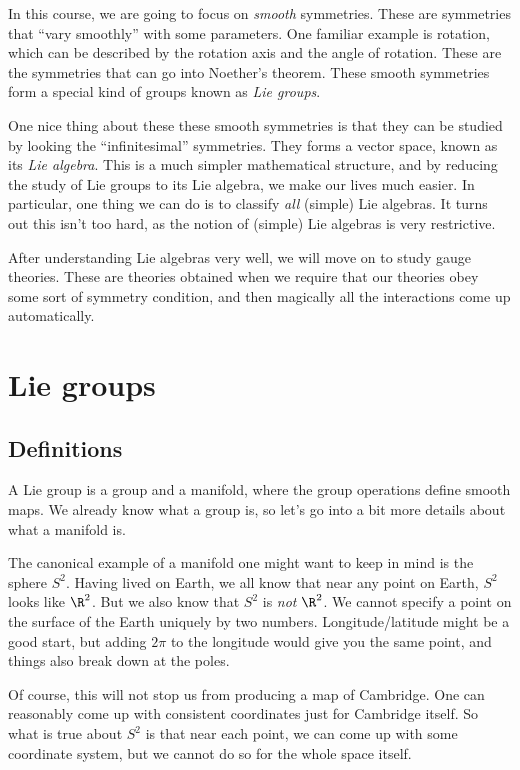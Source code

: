\documentclass[a4paper]{article}
\begin{document}
In this course, we are going to focus on \emph{smooth} symmetries. These are symmetries that ``vary smoothly'' with some parameters. One familiar example is rotation, which can be described by the rotation axis and the angle of rotation. These are the symmetries that can go into Noether's theorem. These smooth symmetries form a special kind of groups known as \emph{Lie groups}.

One nice thing about these these smooth symmetries is that they can be studied by looking the ``infinitesimal'' symmetries. They forms a vector space, known as its \emph{Lie algebra}. This is a much simpler mathematical structure, and by reducing the study of Lie groups to its Lie algebra, we make our lives much easier. In particular, one thing we can do is to classify \emph{all} (simple) Lie algebras. It turns out this isn't too hard, as the notion of (simple) Lie algebras is very restrictive.

After understanding Lie algebras very well, we will move on to study gauge theories. These are theories obtained when we require that our theories obey some sort of symmetry condition, and then magically all the interactions come up automatically.

\section{Lie groups}
\subsection{Definitions}
A Lie group is a group and a manifold, where the group operations define smooth maps. We already know what a group is, so let's go into a bit more details about what a manifold is.

The canonical example of a manifold one might want to keep in mind is the sphere $S^2$. Having lived on Earth, we all know that near any point on Earth, $S^2$ looks like $\R^2$. But we also know that $S^2$ is \emph{not} $\R^2$. We cannot specify a point on the surface of the Earth uniquely by two numbers. Longitude/latitude might be a good start, but adding $2\pi$ to the longitude would give you the same point, and things also break down at the poles.

Of course, this will not stop us from producing a map of Cambridge. One can reasonably come up with consistent coordinates just for Cambridge itself. So what is true about $S^2$ is that near each point, we can come up with some coordinate system, but we cannot do so for the whole space itself.
\end{document}
